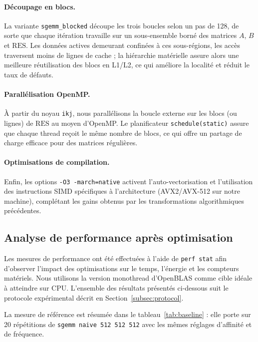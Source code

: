 \documentclass[a4paper,11pt]{article}
\begin{document}
\paragraph{Découpage en blocs.} La variante \texttt{sgemm\_blocked} découpe les trois boucles selon un pas de 128, de sorte que chaque itération travaille sur un sous-ensemble borné des matrices $A$, $B$ et $\text{RES}$. Les données actives demeurant confinées à ces sous-régions, les accès traversent moins de lignes de cache ; la hiérarchie matérielle assure alors une meilleure réutilisation des blocs en L1/L2, ce qui améliore la localité et réduit le taux de défauts.

\paragraph{Parallélisation OpenMP.} À partir du noyau \texttt{ikj}, nous parallélisons la boucle externe sur les blocs (ou lignes) de $\text{RES}$ au moyen d'OpenMP. Le planificateur \texttt{schedule(static)} assure que chaque thread reçoit le même nombre de blocs, ce qui offre un partage de charge efficace pour des matrices régulières.

\paragraph{Optimisations de compilation.} Enfin, les options \texttt{-O3 -march=native} activent l'auto-vectorisation et l'utilisation des instructions SIMD spécifiques à l'architecture (AVX2/AVX-512 sur notre machine), complétant les gains obtenus par les transformations algorithmiques précédentes.

\subsection{Analyse de performance après optimisation}\label{subsec:sgemm-perf}

Les mesures de performance ont été effectuées à l'aide de \texttt{perf stat} afin d'observer l'impact des optimisations sur le temps, l'énergie et les compteurs matériels. Nous utilisons la version monothread d'OpenBLAS comme cible idéale à atteindre sur CPU. L'ensemble des résultats présentés ci-dessous suit le protocole expérimental décrit en Section~\ref{subsec:protocol}.

La mesure de référence est résumée dans le tableau~\ref{tab:baseline} : elle porte sur 20 répétitions de \texttt{sgemm naive 512 512 512} avec les mêmes réglages d'affinité et de fréquence.
\end{document}
